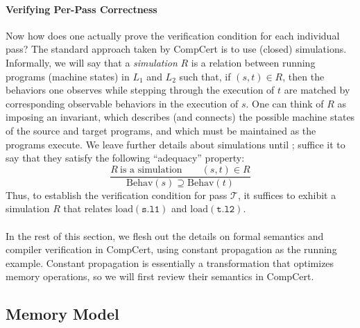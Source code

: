 \paragraph{Verifying Per-Pass Correctness}

Now how does one actually prove the verification condition for each individual pass?  The standard
approach taken by CompCert is to use (closed) simulations.  Informally, we will say that a
\emph{simulation} $R$ is a relation between running programs (\ie machine states) in $L_1$ and $L_2$
such that, if $(s,t) \in R$, then the behaviors one observes while stepping through the execution of
$t$ are matched by corresponding observable behaviors in the execution of $s$.  One can think of $R$
as imposing an invariant, which describes (and connects) the possible machine states of the source
and target programs, and which must be maintained as the programs execute.  We leave further details
about simulations until ; suffice it to say that they satisfy the
following ``adequacy'' property:
\[
\frac{
R~\mbox{is a simulation} \qquad
(s,t)\in R
}{
\mathrm{Behav}(s) \supseteq \mathrm{Behav}(t)
}
\]
Thus, to establish the verification condition for pass $\mathcal{T}$, it suffices to exhibit a
simulation $R$ that relates $\mathrm{load}(\mathtt{s.l1})$ and $\mathrm{load}(\mathtt{t.l2})$.



\paragraph*{}

In the rest of this section, we flesh out the details on formal semantics and compiler verification
in CompCert, using constant propagation as the running example.  Constant propagation is essentially
a transformation that optimizes memory operations, so we will first review their semantics in
CompCert.



\subsection{Memory Model}
\label{sec:background:memory}


